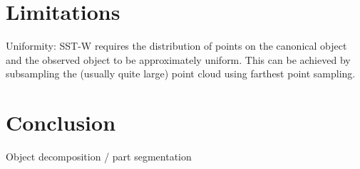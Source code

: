 \documentclass{article}
\newcommand{\ob}[1]{\textcolor{purple}{[\textbf{OB:} #1]}}
\begin{document}

\section{Limitations}

Uniformity: SST-W requires the distribution of points on the canonical object and the observed object to be approximately uniform. This can be achieved by subsampling the (usually quite large) point cloud using farthest point sampling.

\section{Conclusion}

Object decomposition / part segmentation \cite{tenorth13Decomposing,vahrenkamp16Partbased,chen22Neural}


\clearpage


\end{document}
